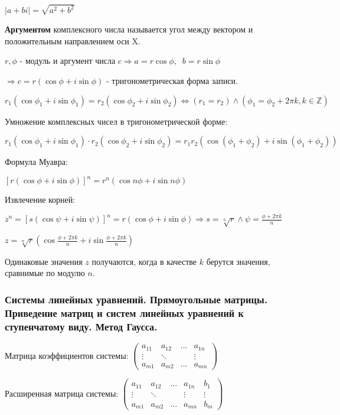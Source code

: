 \documentclass{article}
\begin{document}
$|a + b i| = \sqrt{a^2 + b^2}$

\textbf{Аргументом} комплексного числа называется угол между вектором и положительным
направлением оси X.

$r, \phi$ - модуль и аргумент числа $c \Rightarrow a = r \cos \phi, \;\; b = r \sin \phi$

$\Rightarrow c = r (\cos \phi + i \sin\phi)$ - тригонометрическая форма записи.

$r_1(\cos \phi_1 + i \sin\phi_1) = r_2(\cos \phi_2 + i \sin \phi_2) \iff
(r_1 = r_2) \wedge (\phi_1 = \phi_2 + 2 \pi k, k \in \mathbb{Z})$

Умножение комплексных чисел в тригонометрической форме:

$r_1(\cos \phi_1 + i \sin\phi_1) \cdot r_2 (\cos \phi_2 + i \sin\phi_2) =
r_1 r_2 (\cos(\phi_1 + \phi_2) + i \sin (\phi_1 + \phi_2))$

Формула Муавра:

$[r(\cos\phi + i \sin\phi)]^n = r^n (\cos n\phi + i \sin n\phi)$

Извлечение корней:

$z^n = [s(\cos\psi + i \sin\psi)]^n = r (\cos \phi + i\sin\phi) \Rightarrow
s = \sqrt[n]{r} \wedge \psi = \frac{\phi + 2 \pi k}{n}$

$z = \sqrt[n]{r}(\cos\frac{\phi + 2 \pi k}{n} + i \sin\frac{\phi + 2 \pi k}{n})$

Одинаковые значения $z$ получаются, когда в качестве $k$ берутся значения,
сравнимые по модулю $n$.

\subsubsection{Системы линейных уравнений. Прямоугольные матрицы. Приведение матриц и систем
линейных уравнений к ступенчатому виду. Метод Гаусса.}


Матрица коэффициентов системы:
$\begin{pmatrix}
    a_{11} & a_{12} & ... & a_{1n} \\
    \vdots & \ddots &  & \vdots\\
    a_{m1} & a_{m2} & ... & a_{mn}
\end{pmatrix}$

Расширенная матрица системы:
$\begin{pmatrix}
    a_{11} & a_{12} & ... & a_{1n} & b_1 \\
    \vdots & \ddots &  & \vdots & \vdots \\
    a_{m1} & a_{m2} & ... & a_{mn} & b_m
\end{pmatrix}$
\end{document}
